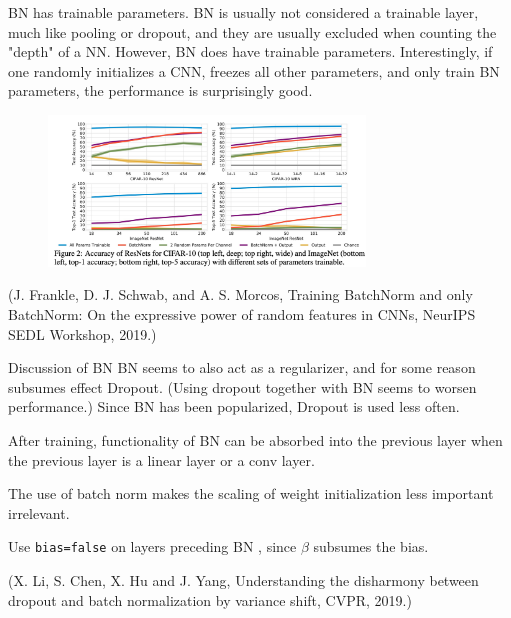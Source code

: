 \begin{frame}[allowframebreaks]

\begin{myconceptblock}{6.50}{BN has trainable parameters.}
    BN is usually not considered a trainable layer, much like pooling or dropout, and they are usually excluded when counting the "depth" of a NN. However, BN does have trainable parameters. Interestingly, if one randomly initializes a CNN, freezes all other parameters, and only train BN parameters, the performance is surprisingly good.

    \begin{figure}[H]
        \centering
        \includegraphics[width=0.75\textwidth]{.././assets/6.14.png}
    \end{figure}

    (J. Frankle, D. J. Schwab, and A. S. Morcos, Training BatchNorm and only BatchNorm: On the expressive power of random features in CNNs, NeurIPS SEDL Workshop, 2019.)
\end{myconceptblock}

\end{frame}

\begin{frame}[allowframebreaks]

\begin{myconceptblock}{6.51}{Discussion of BN}
    BN seems to also act as a regularizer, and for some reason subsumes effect Dropout. (Using dropout together with BN seems to worsen performance.) Since BN has been popularized, Dropout is used less often.

    After training, functionality of BN can be absorbed into the previous layer when the previous layer is a linear layer or a conv layer.

    The use of batch norm makes the scaling of weight initialization less important irrelevant.

    Use \verb|bias=false| on layers preceding BN , since $\beta$ subsumes the bias.

    (X. Li, S. Chen, X. Hu and J. Yang, Understanding the disharmony between dropout and batch normalization by variance shift, CVPR, 2019.)
\end{myconceptblock}

\end{frame}
